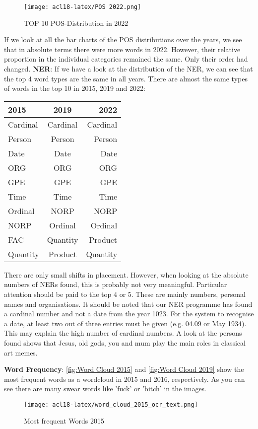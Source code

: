 \documentclass[11pt,a4paper]{article}
\begin{document}
 \begin{figure}[H]
    \centering
    \texttt{[image: acl18-latex/POS 2022.png]}
    \caption{TOP 10 POS-Distribution in 2022}
    \label{fig:POS 2022}
\end{figure}
If we look at all the bar charts of the POS distributions over the years, we see that in absolute terms there were more words  in 2022. However, their relative proportion in the individual categories remained the same. Only their order had changed.
\textbf{NER}: If we have a look at the distribution of the NER, we can see that the top 4 word types are the same in all years. There are almost the same types of words in the top 10 in 2015, 2019 and 2022:  
\\\newline
\begin{center}
    \begin{tabular}[h]{l|c|r}
        2015 & 2019 & 2022  \\
        \hline
         \rowcolor[gray]{0.9} Cardinal & Cardinal & Cardinal\\
         Person & Person & Person\\
         \rowcolor[gray]{0.9} Date & Date & Date \\
         ORG & ORG & ORG \\
         \rowcolor[gray]{0.9} GPE & GPE & GPE\\
         Time & Time & Time\\
         \rowcolor[gray]{0.9} Ordinal &  NORP & NORP\\
         NORP & Ordinal & Ordinal \\
         \rowcolor[gray]{0.9} FAC &  Quantity &  Product\\
         Quantity & Product & Quantity
        \label{tab:TOP NER}    
    \end{tabular}\newline
\end{center}    

There are only small shifts in placement. However, when looking at the absolute numbers of NERs found, this is probably not very meaningful.
Particular attention should be paid to the top 4 or 5. These are mainly numbers, personal names and organisations. It should be noted that our NER programme has found a cardinal number and not a date from the year 1023. For the system to recognise a date, at least two out of three entries must be given (e.g. 04.09 or May 1934). This may explain the high number of cardinal numbers. A look at the persons found shows that Jesus, old gods, you and mum play the main roles in classical art memes.
\newline \par
\textbf{Word Frequency}: \autoref{fig:Word Cloud 2015} and \ref{fig:Word Cloud 2019} show the most frequent words as a wordcloud in 2015 and 2016, respectively. As you can see there are many swear words like 'fuck' or 'bitch' in the images.
\begin{figure}[H]
    \centering
    \texttt{[image: acl18-latex/word\_cloud\_2015\_ocr\_text.png]}
    \caption{Most frequent Words 2015}
    \label{fig:Word Cloud 2015}
\end{figure}
\end{document}
